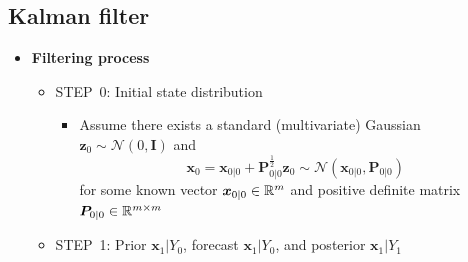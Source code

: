 \documentclass[12pt,a4paper]{article}
\begin{document}
\subsection{Kalman filter}

\begin{itemize}

\item \textbf{Filtering process}

  \begin{itemize}

  \item STEP~0: Initial state distribution
    \begin{itemize}
    \item Assume there exists a standard (multivariate) Gaussian
      $\bm{z}_{0}\sim \mathcal{N}(0,\bm{I})$ and
      \begin{equation}\label{eq:alpha0_linear}%
        \bm{x}_{0} = \bm{x}_{0|0} + \bm{P}_{0|0}^{\frac{1}{2}}\bm{z}_{0} \sim \mathcal{N} (\bm{x}_{0|0},\bm{P}_{0|0})
      \end{equation}
      for some known vector $\bm{x}_{0|0}\in \mathbb{R}^{m}$ and positive definite matrix $\bm{P}_{0|0}\in \mathbb{R}^{m\times m}$
    \end{itemize}

  \item STEP~1:
    Prior $\bm{x}_{1}|Y_{0}$,
    forecast $\bm{x}_{1}|Y_{0}$,
    and posterior $\bm{x}_{1}|Y_{1}$

    \begin{itemize}


\end{itemize}
\end{itemize}
\end{itemize}
\end{document}
